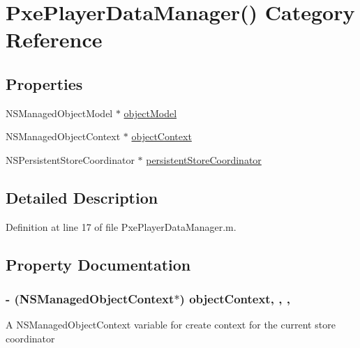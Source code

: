 \hypertarget{category_pxe_player_data_manager_07_08}{\section{Pxe\-Player\-Data\-Manager() Category Reference}
\label{category_pxe_player_data_manager_07_08}
}
\subsection*{Properties}
\begin{DoxyCompactItemize}
\item 
N\-S\-Managed\-Object\-Model $\ast$ \hyperlink{category_pxe_player_data_manager_07_08_a6b7bfe044b621bbbaf643632c6dc7e01}{object\-Model}
\item 
N\-S\-Managed\-Object\-Context $\ast$ \hyperlink{category_pxe_player_data_manager_07_08_aec293ddfcfbce08c156f50fa40df004d}{object\-Context}
\item 
N\-S\-Persistent\-Store\-Coordinator $\ast$ \hyperlink{category_pxe_player_data_manager_07_08_affbb8a325d42a3ce9ef30703bc9e7e54}{persistent\-Store\-Coordinator}
\end{DoxyCompactItemize}


\subsection{Detailed Description}


Definition at line 17 of file Pxe\-Player\-Data\-Manager.\-m.



\subsection{Property Documentation}
\hypertarget{category_pxe_player_data_manager_07_08_aec293ddfcfbce08c156f50fa40df004d}{
\subsubsection[{object\-Context}]{\setlength{\rightskip}{0pt plus 5cm}-\/ (N\-S\-Managed\-Object\-Context$\ast$) object\-Context\hspace{0.3cm}{\ttfamily [read]}, {\ttfamily [write]}, {\ttfamily [nonatomic]}, {\ttfamily [strong]}}}\label{category_pxe_player_data_manager_07_08_aec293ddfcfbce08c156f50fa40df004d}
A N\-S\-Managed\-Object\-Context variable for create context for the current store coordinator 

